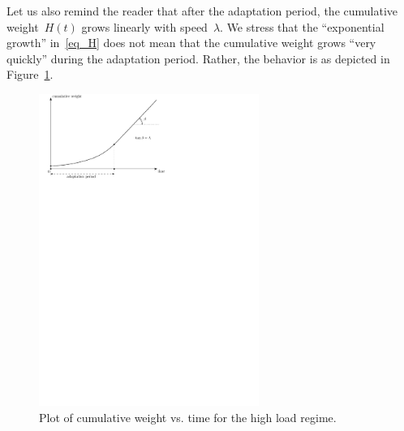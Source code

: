 \documentclass[12pt]{article}
\begin{document}
Let us also remind the reader that
 after the adaptation period,
the cumulative weight~$H(t)$ grows linearly
with speed~$\lambda $. We stress that the ``exponential
growth'' in~\eqref{eq_H} does not mean that 
the cumulative weight grows ``very quickly'' 
during the adaptation period. Rather, the behavior
is as depicted in Figure~\ref{f_adapt_period}.
\begin{figure}
 \centering \includegraphics[width=0.64\textwidth]{adapt_period_1} 
\caption{Plot of cumulative weight vs. time for the high load regime.
}
\label{f_adapt_period}
\end{figure}


\goodbreak
\end{document}
